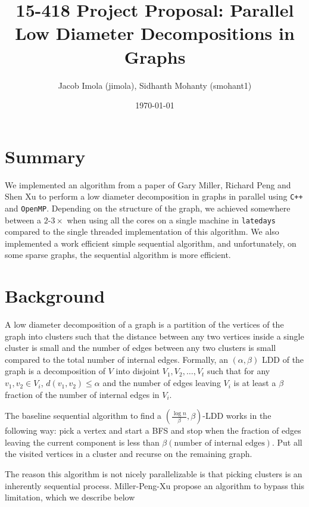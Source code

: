 \documentclass[11pt]{scrartcl}
\theoremstyle{plain}
\theoremstyle{definition}
\theoremstyle{remark}
\begin{document}
\title{15-418 Project Proposal: Parallel Low Diameter Decompositions in Graphs}
\author{\textsf{Jacob Imola (jimola), Sidhanth Mohanty (smohant1)}}
\date{\textsf{\today}}
\maketitle

\section{Summary}
We implemented an algorithm from a paper of Gary Miller, Richard Peng and Shen Xu \cite{miller2013parallel}
to perform a low diameter decomposition in graphs in parallel using \texttt{C++} and \texttt{OpenMP}.
Depending on the structure of the graph, we achieved somewhere between a $2$-$3\times$ when using all
the cores on a single machine in \texttt{latedays} compared to the single threaded implementation of
this algorithm. We also implemented a work efficient simple sequential algorithm, and unfortunately,
on some sparse graphs, the sequential algorithm is more efficient.

\section{Background}
A low diameter decomposition of a graph is a partition of the vertices of the graph into clusters such
that the distance between any two vertices inside a single cluster is small and the number of edges
between any two clusters is small compared to the total number of internal edges. Formally, an $(\alpha,
\beta)$ LDD of the graph is a decomposition of $V$ into disjoint $V_1,V_2,\ldots,V_t$ such that for
any $v_1,v_2\in V_i$, $d(v_1,v_2)\leq\alpha$ and the number of edges leaving $V_i$ is at least a
$\beta$ fraction of the number of internal edges in $V_i$.

The baseline sequential algorithm to find a $(\frac{\log n}{\beta},\beta)$-LDD works in the following way:
pick a vertex and start a BFS and stop when the fraction of edges leaving the current component is less
than $\beta(\text{number of internal edges})$. Put all the visited vertices in a cluster and recurse on the
remaining graph.

The reason this algorithm is not nicely parallelizable is that picking clusters is an inherently sequential process.
Miller-Peng-Xu \cite{miller2013parallel} propose an algorithm to bypass this limitation, which we describe below
\end{document}
